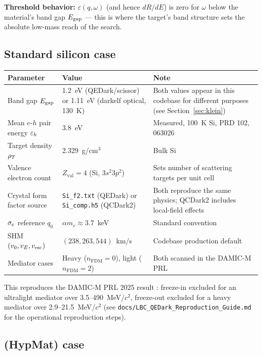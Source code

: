 \textbf{Threshold behavior:} $\varepsilon(q,\omega)$ (and hence $dR/dE$) is
zero for $\omega$ below the material's band gap $E_\mathrm{gap}$ — this is where the
target's band structure sets the absolute low-mass reach of the search.

\subsection{Standard silicon case}

\begin{center}
\begin{tabular}{@{}p{4.3cm}p{4cm}p{5.5cm}@{}}
\toprule
Parameter & Value & Note \\
\midrule
Band gap $E_\mathrm{gap}$ & 1.2~eV (QEDark/scissor) or 1.11~eV (darkelf optical, 130~K) &
  Both values appear in this codebase for different purposes (see Section~\ref{sec:klein}) \\
Mean $e$-$h$ pair energy $\varepsilon_h$ & 3.8~eV & Measured, 100~K Si, PRD 102, 063026 \\
Target density $\rho_T$ & 2.329~g/cm$^3$ & Bulk Si \\
Valence electron count & $Z_\mathrm{val}=4$ (Si, $3s^2 3p^2$) & Sets number of scattering targets per unit cell \\
Crystal form factor source & \texttt{Si\_f2.txt} (QEDark) or \texttt{Si\_comp.h5} (QCDark2) & Both reproduce the same physics; QCDark2 includes local-field effects \\
$\sigma_e$ reference $q_0$ & $\alpha m_e \approx 3.7$~keV & Standard convention \\
SHM $(v_0,v_E,v_\mathrm{esc})$ & $(238,263,544)$~km/s & Codebase production default \\
Mediator cases & Heavy ($n_\mathrm{FDM}=0$), light ($n_\mathrm{FDM}=2$) & Both scanned in the DAMIC-M PRL \\
\bottomrule
\end{tabular}
\end{center}

This reproduces the DAMIC-M PRL 2025 result \citep{DAMICM2025}: freeze-in
excluded for an ultralight mediator over 3.5--490~MeV/$c^2$, freeze-out
excluded for a heavy mediator over 2.9--21.5~MeV/$c^2$ (see
\texttt{docs/LBC\_QEDark\_Reproduction\_Guide.md} for the operational
reproduction steps).

\subsection{\SrCdSb{} (HypMat) case}
\label{sec:dme-hypmat}

